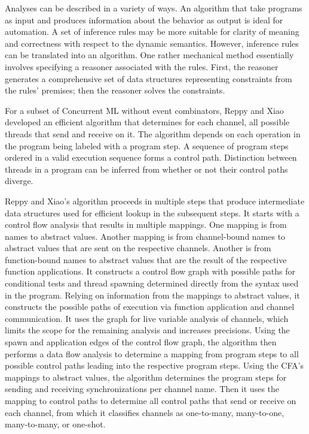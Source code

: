 \documentclass[letterpaper, 11pt]{report}
\begin{document}
Analyses can be described in a variety of ways. An algorithm that take programs
as input and produces information about the behavior as output is ideal for automation. A
set of inference rules may be more suitable for clarity of meaning and correctness 
with respect to the dynamic semantics. 
However, inference rules can be translated into an algorithm.
One rather mechanical method essentially involves specifying a reasoner associated with the rules. 
First, the reasoner generates a comprehensive set of data structures representing
constraints from the rules' premises; then the reasoner solves the constraints.

For a subset of Concurrent ML without event combinators, Reppy and Xiao developed an
efficient algorithm that determines for each channel, all possible threads that send
and receive on it. The algorithm depends on each operation in the program being
labeled with a program step. A sequence of program steps ordered in a valid execution
sequence forms a control path. Distinction between threads in a program can be inferred from
whether or not their control paths diverge.

Reppy and Xiao's algorithm proceeds in multiple steps that produce intermediate data structures used for
efficient lookup in the subsequent steps. It starts with a control flow analysis that
results in multiple mappings. One mapping is from names to abstract values.
Another mapping is from channel-bound names to abstract values that are
sent on the respective channels. Another is from function-bound names to abstract values
that are the result of the respective function applications. It constructs a control flow graph 
with possible paths for conditional tests and thread spawning determined directly from the
syntax used in the program. Relying on information from the mappings to abstract values,
it constructs the possible paths of execution via function application and channel
communication. It uses the graph for live variable analysis of channels, which limits the
scope for the remaining analysis and increases precisions. 
Using the spawn and application edges of the control flow
graph, the algorithm then performs a data flow analysis to determine a mapping from program
steps to all possible control paths leading into the respective program steps. Using the
CFA's mappings to abstract values, the algorithm determines the program steps for sending and
receiving synchronizations per channel name. Then it uses the mapping to control paths to determine all
control paths that send or receive on each channel, from which it classifies channels as
one-to-many, many-to-one, many-to-many, or one-shot.
\end{document}
